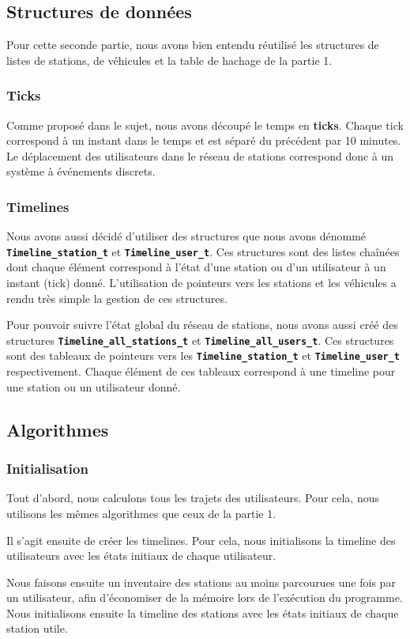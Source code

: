 \documentclass[a4paper, 12pt]{report}
\begin{document}
\subsection{Structures de données}
Pour cette seconde partie, nous avons bien entendu réutilisé les structures de listes de stations, de véhicules et la table de hachage de la partie 1.\par\bigskip
\subsubsection{Ticks}
Comme proposé dans le sujet, nous avons découpé le temps en \textbf{ticks}. Chaque tick correspond à un instant dans le temps et est séparé du précédent par 10 minutes. Le déplacement des utilisateurs dans le réseau de stations correspond donc à un système à événements discrets.\par\bigskip
\subsubsection{Timelines}
Nous avons aussi décidé d'utiliser des structures que nous avons dénommé \textbf{\texttt{Timeline\_station\_t}} et \textbf{\texttt{Timeline\_user\_t}}. Ces structures sont des listes chaînées dont chaque élément correspond à l'état d'une station ou d'un utilisateur à un instant (tick) donné. L'utilisation de pointeurs vers les stations et les véhicules a rendu très simple la gestion de ces structures.\par\bigskip
Pour pouvoir suivre l'état global du réseau de stations, nous avons aussi créé des structures \textbf{\texttt{Timeline\_all\_stations\_t}} et \textbf{\texttt{Timeline\_all\_users\_t}}. Ces structures sont des tableaux de pointeurs vers les \textbf{\texttt{Timeline\_station\_t}} et \textbf{\texttt{Timeline\_user\_t}} respectivement. Chaque élément de ces tableaux correspond à une timeline pour une station ou un utilisateur donné.\par\bigskip
\subsection{Algorithmes}
\subsubsection{Initialisation}
Tout d'abord, nous calculons tous les trajets des utilisateurs. Pour cela, nous utilisons les mêmes algorithmes que ceux de la partie 1.\par\bigskip
Il s'agit ensuite de créer les timelines. Pour cela, nous initialisons la timeline des utilisateurs avec les états initiaux de chaque utilisateur.\par\bigskip
Nous faisons ensuite un inventaire des stations au moins parcourues une fois par un utilisateur, afin d'économiser de la mémoire lors de l'exécution du programme. Nous initialisons ensuite la timeline des stations avec les états initiaux de chaque station utile.\par\bigskip
\end{document}
